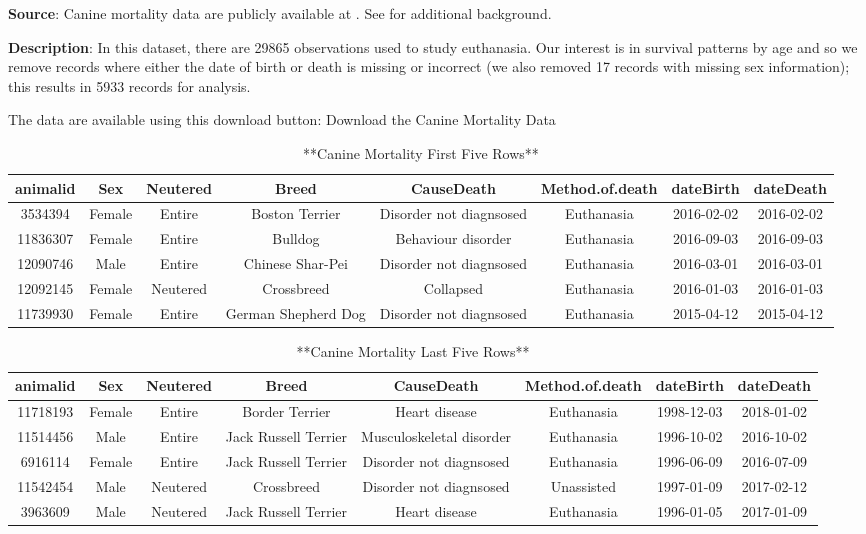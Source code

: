 \documentclass[
]{book}
\begin{document}
\textbf{Source}: Canine mortality data are publicly available at \citet{pegram2021Data}. See \citet{pegram2021proportion} for additional background.

\textbf{Description}: In this dataset, there are 29865 observations used to study euthanasia. Our interest is in survival patterns by age and so we remove records where either the date of birth or death is missing or incorrect (we also removed 17 records with missing sex information); this results in 5933 records for analysis.

The data are available using this download button:
Download the Canine Mortality Data

\begin{table}

\caption{\label{tab:unnamed-chunk-18}**Canine Mortality First Five Rows**}
\centering
\begin{tabular}[t]{c|c|c|c|c|c|c|c}
\hline
animalid & Sex & Neutered & Breed & CauseDeath & Method.of.death & dateBirth & dateDeath\\
\hline
3534394 & Female & Entire & Boston Terrier & Disorder not diagnsosed & Euthanasia & 2016-02-02 & 2016-02-02\\
\hline
11836307 & Female & Entire & Bulldog & Behaviour disorder & Euthanasia & 2016-09-03 & 2016-09-03\\
\hline
12090746 & Male & Entire & Chinese Shar-Pei & Disorder not diagnsosed & Euthanasia & 2016-03-01 & 2016-03-01\\
\hline
12092145 & Female & Neutered & Crossbreed & Collapsed & Euthanasia & 2016-01-03 & 2016-01-03\\
\hline
11739930 & Female & Entire & German Shepherd Dog & Disorder not diagnsosed & Euthanasia & 2015-04-12 & 2015-04-12\\
\hline
\end{tabular}
\end{table}

\begin{table}

\caption{\label{tab:unnamed-chunk-18}**Canine Mortality Last Five Rows**}
\centering
\begin{tabular}[t]{c|c|c|c|c|c|c|c}
\hline
animalid & Sex & Neutered & Breed & CauseDeath & Method.of.death & dateBirth & dateDeath\\
\hline
11718193 & Female & Entire & Border Terrier & Heart disease & Euthanasia & 1998-12-03 & 2018-01-02\\
\hline
11514456 & Male & Entire & Jack Russell Terrier & Musculoskeletal disorder & Euthanasia & 1996-10-02 & 2016-10-02\\
\hline
6916114 & Female & Entire & Jack Russell Terrier & Disorder not diagnsosed & Euthanasia & 1996-06-09 & 2016-07-09\\
\hline
11542454 & Male & Neutered & Crossbreed & Disorder not diagnsosed & Unassisted & 1997-01-09 & 2017-02-12\\
\hline
3963609 & Male & Neutered & Jack Russell Terrier & Heart disease & Euthanasia & 1996-01-05 & 2017-01-09\\
\hline
\end{tabular}
\end{table}
\end{document}
